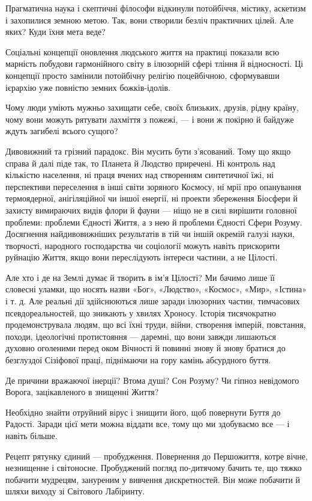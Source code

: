 Прагматична наука і скептичні філософи відкинули потойбіччя, містику, аскетизм
і захопилися земною метою. Так, вони створили безліч практичних цілей. Але
яких? Куди їхня мета веде?

Соціальні концепції оновлення людського життя на практиці показали всю марність
побудови гармонійного світу в ілюзорній сфері тління й відносності. Ці
концепції просто замінили потойбічну релігію поцейбічною, сформувавши ієрархію
уже повністю земних божків-ідолів.

Чому люди уміють мужньо захищати себе, своїх близьких, друзів, рідну країну,
чому вони можуть рятувати лахміття з пожежі, — і вони ж покірно й байдуже ждуть
загибелі всього сущого?

Дивовижний та грізний парадокс. Він мусить бути з’ясований. Тому що якщо справа
й далі піде так, то Планета й Людство приречені. Ні контроль над кількістю
населення, ні праця вчених над створенням синтетичної їжі, ні перспективи
переселення в інші світи зоряного Космосу, ні мрії про опанування термоядерної,
анігіляційної чи іншої енергії, ні проекти збереження Біосфери й захисту
вимираючих видів флори й фауни — ніщо не в силі вирішити головної проблеми:
проблеми Єдності Життя, а з нею й проблеми Єдності Сфери Розуму. Досягнення
найдивовижніших результатів в тій чи іншій окремій галузі науки, творчості,
народного господарства чи соціології можуть навіть прискорити руйнацію Життя,
якщо вони переслідують інтереси частини, а не Цілості.

Але хто і де на Землі думає й творить в ім’я Цілості? Ми бачимо лише її
словесні уламки, що носять назви «Бог», «Людство», «Космос», «Мир», «Істина» і
т. д. Але реальні дії здійснюються лише заради ілюзорних частин, тимчасових
псевдореальностей, що зникають у хвилях Хроносу. Історія тисячократно
продемонструвала людям, що всі їхні труди, війни, створення імперій, повстання,
походи, ідеологічні протистояння — даремні, що вони завжди лишаються духовно
оголеними перед оком Вічності й повинні знову й знову братися до безглуздої
Сізіфової праці, піднімаючи на гору камінь абсурдного буття.

Де причини вражаючої інерції? Втома душі? Сон Розуму? Чи гіпноз невідомого
Ворога, зацікавленого в знищенні Життя?

Необхідно знайти отруйний вірус і знищити його, щоб повернути Буття до Радості.
Заради цієї мети можна віддати все, тому що ми здобуваємо все — і навіть
більше.

Рецепт рятунку єдиний — пробудження. Повернення до Першожиття, котре вічне,
незнищенне і світоносне. Пробуджений погляд по-дитячому бачить те, що тяжко
побачити мудрецям, зануреним у вивчення дискретностей. Він може побачити й
шляхи виходу зі Світового Лабіринту.

